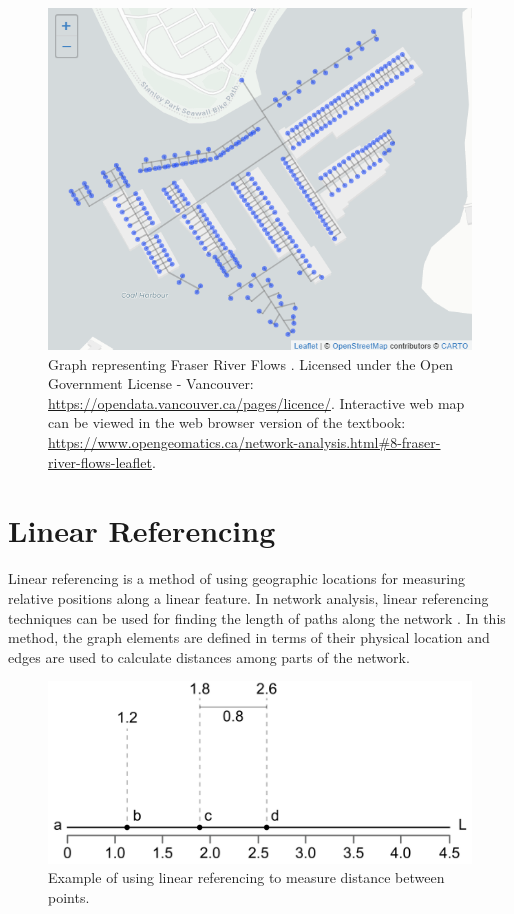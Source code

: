 \documentclass[
]{book}
\begin{document}
\begin{figure}
\includegraphics[width=8.56in]{images/08-Tree-spatial-structure-of-a-boat-marina-static} \caption{Graph representing Fraser River Flows \citep{city_of_vancouver_open_nodate}. Licensed under the Open Government License - Vancouver: \url{https://opendata.vancouver.ca/pages/licence/}. Interactive web map can be viewed in the web browser version of the textbook: \url{https://www.opengeomatics.ca/network-analysis.html\#8-fraser-river-flows-leaflet}.}\label{fig:8-fraser-river-flows-leaflet}
\end{figure}

\section{Linear Referencing}\label{linear-referencing}

Linear referencing is a method of using geographic locations for measuring relative positions along a linear feature. In network analysis, linear referencing techniques can be used for finding the length of paths along the network \citep{ramsey_23_2012}. In this method, the graph elements are defined in terms of their physical location and edges are used to calculate distances among parts of the network.

\begin{figure}
\includegraphics[width=0.8\linewidth]{images/08-linear_referencing} \caption{Example of using linear referencing to measure distance between points.}\label{fig:8-lienar-referencing}
\end{figure}
\end{document}

